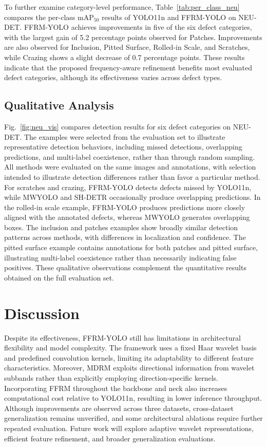 \documentclass[pdflatex,sn-nature]{sn-jnl}
\begin{document}
To further examine category-level performance,
Table~\ref{tab:per_class_neu} compares the
per-class mAP$_{50}$ results of YOLO11n and
FFRM-YOLO on NEU-DET. FFRM-YOLO achieves
improvements in five of the six defect categories,
with the largest gain of 5.2 percentage points
observed for Patches. Improvements are also
observed for Inclusion, Pitted Surface, Rolled-in
Scale, and Scratches, while Crazing shows a slight
decrease of 0.7 percentage points. These results
indicate that the proposed frequency-aware
refinement benefits most evaluated defect
categories, although its effectiveness varies
across defect types.


\subsection{Qualitative Analysis}

Fig.~\ref{fig:neu_vis} compares detection results for six defect categories on NEU-DET. The examples were selected from the evaluation set to illustrate representative detection behaviors, including missed detections, overlapping predictions, and multi-label coexistence, rather than through random sampling. All methods were evaluated on the same images and annotations, with selection intended to illustrate detection differences rather than favor a particular method. For scratches and crazing, FFRM-YOLO detects defects missed by YOLO11n, while MWYOLO and SH-DETR occasionally produce overlapping predictions. In the rolled-in scale example, FFRM-YOLO produces predictions more closely aligned with the annotated defects, whereas MWYOLO generates overlapping boxes. The inclusion and patches examples show broadly similar detection patterns across methods, with differences in localization and confidence. The pitted surface example contains annotations for both patches and pitted surface, illustrating multi-label coexistence rather than necessarily indicating false positives. These qualitative observations complement the quantitative results obtained on the full evaluation set.


\section{Discussion}\label{sec:limitations}
Despite its effectiveness, FFRM-YOLO still has limitations in architectural flexibility and model complexity. The framework uses a fixed Haar wavelet basis and predefined convolution kernels, limiting its adaptability to different feature characteristics. Moreover, MDRM exploits directional information from wavelet subbands rather than explicitly employing direction-specific kernels. Incorporating FFRM throughout the backbone and neck also increases computational cost relative to YOLO11n, resulting in lower inference throughput. Although improvements are observed across three datasets, cross-dataset generalization remains unverified, and some architectural ablations require further repeated evaluation. Future work will explore adaptive wavelet representations, efficient feature refinement, and broader generalization evaluations.
\end{document}
